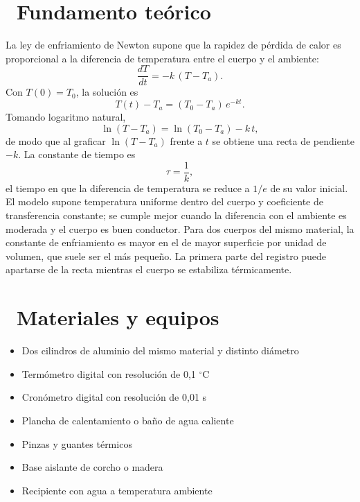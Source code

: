 \documentclass[11pt,a4paper]{article}
\newcommand{\iconotexto}[2]{\textcolor{cyanNeon}{\faIcon{#1}}~#2}
\begin{document}
\section{\iconotexto{book-open}{Fundamento teórico}}

La ley de enfriamiento de Newton supone que la rapidez de pérdida de calor
es proporcional a la diferencia de temperatura entre el cuerpo y el
ambiente:
\[
  \frac{dT}{dt} = -k\,(T - T_a).
\]
Con $T(0) = T_0$, la solución es
\[
  T(t) - T_a = (T_0 - T_a)\,e^{-k t}.
\]
Tomando logaritmo natural,
\[
  \ln\left(T - T_a\right) = \ln\left(T_0 - T_a\right) - k\,t,
\]
de modo que al graficar $\ln(T-T_a)$ frente a $t$ se obtiene una recta de
pendiente $-k$. La constante de tiempo es
\[
  \tau = \frac{1}{k},
\]
el tiempo en que la diferencia de temperatura se reduce a $1/e$ de su
valor inicial. El modelo supone temperatura uniforme dentro del cuerpo y
coeficiente de transferencia constante; se cumple mejor cuando la
diferencia con el ambiente es moderada y el cuerpo es buen conductor. Para
dos cuerpos del mismo material, la constante de enfriamiento es mayor en
el de mayor superficie por unidad de volumen, que suele ser el más
pequeño. La primera parte del registro puede apartarse de la recta
mientras el cuerpo se estabiliza térmicamente.

\begin{center}
\par{}
\end{center}

\section{\iconotexto{box-open}{Materiales y equipos}}

\begin{itemize}[leftmargin=1.4em,itemsep=2pt,topsep=3pt]
  \item Dos cilindros de aluminio del mismo material y distinto diámetro
  \item Termómetro digital con resolución de 0,1 $^{\circ}$C
  \item Cronómetro digital con resolución de 0,01 s
  \item Plancha de calentamiento o baño de agua caliente
  \item Pinzas y guantes térmicos
  \item Base aislante de corcho o madera
  \item Recipiente con agua a temperatura ambiente
\end{itemize}
\end{document}
